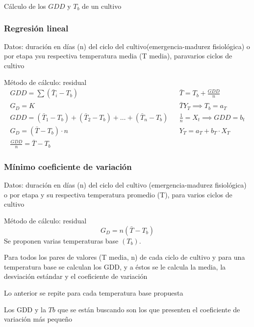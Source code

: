 Cálculo de los $GDD$ y $T_b$ de un cultivo

\subsubsection{Regresión lineal}

Datos: duración en días (n) del ciclo del cultivo(emergencia-madurez fisiológica) o por etapa ysu respectiva temperatura media (T media), paravarios ciclos de cultivo

Método de cálculo: residual
\begin{align*}
    GDD=\sum\left(\bar{T}_i-T_b\right)&&\bar{T}=T_b+\frac{GDD}{n}\\
    G_D= K&&\bar{T}  Y_T\implies T_b =a_T\\
    GDD=\left(\bar{T}_1- T_b\right) +\left(\bar{T}_2- T_b\right)+\dots +\left(\bar{T}_n- T_b\right)&& \frac{1}{n}= X_t\implies GDD=b_t\\
    G_D=\left(\bar{T}- T_b\right)\cdot n&&Y_T= a_T+b_T\cdot X_T\\
    \frac{GDD}{n}=\bar{T}- T_b
\end{align*}

\subsubsection{Mínimo coeficiente de variación}

Datos: duración en días (n) del ciclo del
cultivo (emergencia-madurez fisiológica) o por
etapa y su respectiva temperatura promedio
(T), para varios ciclos de cultivo

Método de cálculo: residual
\begin{equation}
    G_D=n\left(\bar{T}- T_b\right)
\end{equation}
Se proponen varias temperaturas base $(T_b)$.

Para todos los pares de valores (T media, n) de cada ciclo de cultivo y para una temperatura base se calculan los GDD, y a éstos se le calcula la media, la desviación estándar y el coeficiente de variación

Lo anterior se repite para cada temperatura base propuesta

Los GDD y la $Tb$ que se están buscando son los que presenten el coeficiente de variación más pequeño

